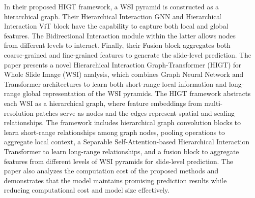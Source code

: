 \documentclass[journal,twoside,web]{ieeecolor}
\begin{document}
In their proposed HIGT framework\cite{guo2023higt}, a WSI pyramid is constructed as a hierarchical graph. Their Hierarchical Interaction GNN and Hierarchical Interaction ViT block have the capability to capture both local and global features. The Bidirectional Interaction module within the latter allows nodes from different levels to interact. Finally, their Fusion block aggregates both coarse-grained and fine-grained features to generate the slide-level prediction.
The paper presents a novel Hierarchical Interaction Graph-Transformer (HIGT) for Whole Slide Image (WSI) analysis, which combines Graph Neural Network and Transformer architectures to learn both short-range local information and long-range global representation of the WSI pyramids.
The HIGT framework abstracts each WSI as a hierarchical graph, where feature embeddings from multi-resolution patches serve as nodes and the edges represent spatial and scaling relationships.
The framework includes hierarchical graph convolution blocks to learn short-range relationships among graph nodes, pooling operations to aggregate local context, a Separable Self-Attention-based Hierarchical Interaction Transformer to learn long-range relationships, and a fusion block to aggregate features from different levels of WSI pyramids for slide-level prediction.
The paper also analyzes the computation cost of the proposed methods and demonstrates that the model maintains promising prediction results while reducing computational cost and model size effectively.
\end{document}
